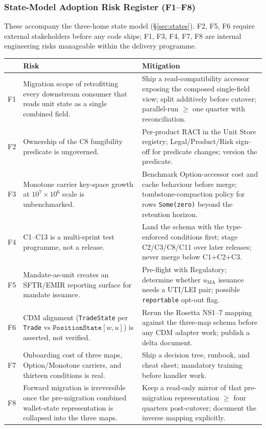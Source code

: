 \documentclass[11pt,a4paper]{article}
\begin{document}
\subsubsection{State-Model Adoption Risk Register (F1--F8)}

These accompany the three-home state model (\S\ref{sec:states}). F2, F5, F6 require external stakeholders before any code ships; F1, F3, F4, F7, F8 are internal engineering risks manageable within the delivery programme.

\begin{longtable}{@{}p{0.5cm}p{6.3cm}p{6.3cm}@{}}
\toprule
& \textbf{Risk} & \textbf{Mitigation} \\
\midrule
\endhead
F1 & Migration scope of retrofitting every downstream consumer that reads unit state as a single combined field. & Ship a read-compatibility accessor exposing the composed single-field view; split additively before cutover; parallel-run $\geq$ one quarter with reconciliation. \\
F2 & Ownership of the C8 fungibility predicate is ungoverned. & Per-product RACI in the Unit Store registry; Legal/Product/Risk sign-off for predicate changes; version the predicate. \\
F3 & Monotone carrier key-space growth at $10^7\times10^6$ scale is unbenchmarked. & Benchmark Option-accessor cost and cache behaviour before merge; tombstone-compaction policy for rows \texttt{Some(zero)} beyond the retention horizon. \\
F4 & C1--C13 is a multi-sprint test programme, not a release. & Land the schema with the type-enforced conditions first; stage C2/C3/C8/C11 over later releases; never merge below C1+C2+C3. \\
F5 & Mandate-as-unit creates an SFTR/EMIR reporting surface for mandate issuance. & Pre-flight with Regulatory; determine whether $u_{\mathrm{MA}}$ issuance needs a UTI/LEI pair; possible \texttt{reportable} opt-out flag. \\
F6 & CDM alignment (\texttt{TradeState} per \texttt{Trade} vs $\texttt{PositionState}[w,u]$) is asserted, not verified. & Rerun the Rosetta NS1--7 mapping against the three-map schema before any CDM adapter work; publish a delta document. \\
F7 & Onboarding cost of three maps, Option/Monotone carriers, and thirteen conditions is real. & Ship a decision tree, runbook, and cheat sheet; mandatory training before handler work. \\
F8 & Forward migration is irreversible once the pre-migration combined wallet-state representation is collapsed into the three maps. & Keep a read-only mirror of that pre-migration representation $\geq$ four quarters post-cutover; document the inverse mapping explicitly. \\
\bottomrule
\end{longtable}
\end{document}
